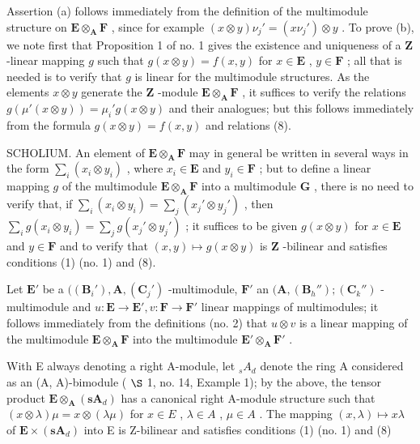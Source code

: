 Assertion (a) follows immediately from the definition of the multimodule structure on \(\mathbf{E} \otimes_{\mathbf{A}} \mathbf{F}\) , since for example \((x \otimes y)\nu_j' = (x\nu_j') \otimes y\) . To prove (b), we note first that Proposition 1 of no. 1 gives the existence and uniqueness of a \(\mathbf{Z}\) -linear mapping \(g\) such that \(g(x \otimes y) = f(x, y)\) for \(x \in \mathbf{E}\) , \(y \in \mathbf{F}\) ; all that is needed is to verify that \(g\) is linear for the multimodule structures. As the elements \(x \otimes y\) generate the \(\mathbf{Z}\) -module \(\mathbf{E} \otimes_{\mathbf{A}} \mathbf{F}\) , it suffices to verify the relations \(g(\mu'(x \otimes y)) = \mu_i' g(x \otimes y)\) and their analogues; but this follows immediately from the formula \(g(x \otimes y) = f(x, y)\) and relations (8).

SCHOLIUM. An element of \(\mathbf{E} \otimes_{\mathbf{A}} \mathbf{F}\) may in general be written in several ways in the form \(\sum_{i} (x_i \otimes y_i)\) , where \(x_i \in \mathbf{E}\) and \(y_i \in \mathbf{F}\) ; but to define a linear mapping \(g\) of the multimodule \(\mathbf{E} \otimes_{\mathbf{A}} \mathbf{F}\) into a multimodule \(\mathbf{G}\) , there is no need to verify that, if \(\sum_{i} (x_i \otimes y_i) = \sum_{j} (x_j' \otimes y_j')\) , then \(\sum_{i} g(x_i \otimes y_i) = \sum_{j} g(x_j' \otimes y_j')\) ; it suffices to be given \(g(x \otimes y)\) for \(x \in \mathbf{E}\) and \(y \in \mathbf{F}\) and to verify that \((x, y) \mapsto g(x \otimes y)\) is \(\mathbf{Z}\) -bilinear and satisfies conditions (1) (no. 1) and (8).

Let \(\mathbf{E}'\) be a \(((\mathbf{B}_i'),\mathbf{A},(\mathbf{C}_j')\) -multimodule, \(\mathbf{F}'\) an \((\mathbf{A},(\mathbf{B}_h'');(\mathbf{C}_k'')\) -multimodule and \(u:\mathbf{E}\to \mathbf{E}',v:\mathbf{F}\to \mathbf{F}'\) linear mappings of multimodules; it follows immediately from the definitions (no. 2) that \(u\otimes v\) is a linear mapping of the multimodule \(\mathbf{E}\otimes_{\mathbf{A}}\mathbf{F}\) into the multimodule \(\mathbf{E}'\otimes_{\mathbf{A}}\mathbf{F}'\) .

With E always denoting a right A-module, let \(_{s}A_{d}\) denote the ring A considered as an (A, A)-bimodule ( \(\S\) 1, no. 14, Example 1); by the above, the tensor product \(\mathbf{E} \otimes_{\mathbf{A}} (\mathbf{s}\mathbf{A}_{d})\) has a canonical right A-module structure such that \((x \otimes \lambda)\mu = x \otimes (\lambda\mu)\) for \(x \in E\) , \(\lambda \in A\) , \(\mu \in A\) . The mapping \((x, \lambda) \mapsto x\lambda\) of \(\mathbf{E} \times (\mathbf{s}\mathbf{A}_{d})\) into E is Z-bilinear and satisfies conditions (1) (no. 1) and (8)


